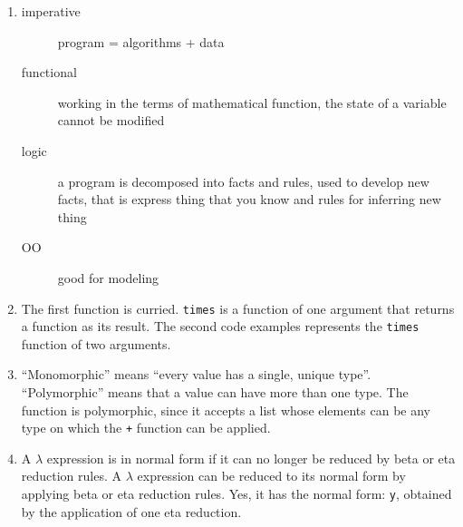 \begin{enumerate}
\item 
	\begin{description}
	\item [imperative] program = algorithms + data
	\item [functional] working in the terms of mathematical function, the state of a variable cannot be modified
	\item [logic] a program is decomposed into facts and rules, used to develop new facts, that is express thing that you know and rules for inferring new thing
	\item [OO] good for modeling
	\end{description}
\iffalse
\item
	1 \% 1\\
	3 \% 1 3\\
	add \% 4\\
	2 \% 4 2\\
	mul \% 8
\fi
\item The first function is curried. \texttt{times} is a function of one argument that returns a function as its result. The second code examples represents the \texttt{times} function of two arguments.
\item  ``Monomorphic'' means ``every value has a single, unique type''. ``Polymorphic'' means that a value can have more than one type. The function is polymorphic, since it accepts a list whose elements can be any type on which the \texttt{+} function can be applied.
\item A $\lambda$ expression is in normal form if it can no longer be reduced by beta or eta reduction rules. A $\lambda$ expression can be reduced to its normal form by applying beta or eta reduction rules. Yes, it has the normal form: \texttt{y}, obtained by the application of one eta reduction.

\end{enumerate}
